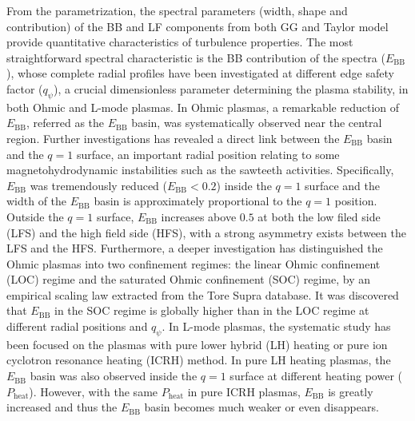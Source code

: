 From the parametrization, the spectral parameters (width, shape and contribution) of the BB and LF components from both GG and Taylor model provide quantitative characteristics of turbulence properties. The most straightforward spectral characteristic is the BB contribution of the spectra ($E_\mathrm{BB}$), whose complete radial profiles have been investigated at different edge safety factor ($q_{\psi}$), a crucial dimensionless parameter determining the plasma stability, in both Ohmic and L-mode plasmas. In Ohmic plasmas, a remarkable reduction of $E_\mathrm{BB}$, referred as the $E_\mathrm{BB}$ basin, was systematically observed near the central region. Further investigations has revealed a direct link between the $E_\mathrm{BB}$ basin and the $q = 1$ surface, an important radial position relating to some magnetohydrodynamic instabilities such as the sawteeth activities. Specifically, $E_\mathrm{BB}$ was tremendously reduced ($E_\mathrm{BB} < 0.2$) inside the $q = 1$ surface and the width of the $E_\mathrm{BB}$ basin is approximately proportional to the $q = 1$ position. Outside the $q = 1$ surface, $E_\mathrm{BB}$ increases above $0.5$ at both the low filed side (LFS) and the high field side (HFS), with a strong asymmetry exists between the LFS and the HFS. Furthermore, a deeper investigation has distinguished the Ohmic plasmas into two confinement regimes: the linear Ohmic confinement (LOC) regime and the saturated Ohmic confinement (SOC) regime, by an empirical scaling law extracted from the Tore Supra database. It was discovered that $E_\mathrm{BB}$ in the SOC regime is globally higher than in the LOC regime at different radial positions and $q_{\psi}$. In L-mode plasmas, the systematic study has been focused on the plasmas with pure lower hybrid (LH) heating or pure ion cyclotron resonance heating (ICRH) method. In pure LH heating plasmas, the $E_\mathrm{BB}$ basin was also observed inside the $q = 1$ surface at different heating power ($P_\mathrm{heat}$). However, with the same $P_\mathrm{heat}$ in pure ICRH plasmas, $E_\mathrm{BB}$ is greatly increased and thus the $E_\mathrm{BB}$ basin becomes much weaker or even disappears. 


